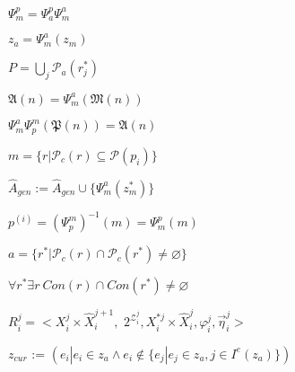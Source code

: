 \documentclass[preview,convert={density=800,outext=.png},border=5pt]{standalone}
\begin{document}
%	
%	

	$\Psi_m^p=\Psi_a^p\Psi_m^a$
	
	$z_a = \Psi_m^a(z_m)$
	
	$P=\bigcup_j\mathcal{P}_a(r_j^*)$
		
	$\mathfrak A(n)=\Psi_m^a(\mathfrak M(n))$
	
	$\Psi_m^a\Psi_p^m(\mathfrak P(n))=\mathfrak A(n)$
	
	$m=\{r|\mathcal{P}_c(r)\subseteq\mathcal{P}(p_i)\}$
	
	$\hat A_{gen} := \hat A_{gen}\cup\{\Psi_m^a(z_m^*)\}$
	
	$p^{(i)}={(\Psi_p^m)}^{-1}(m)=\Psi_m^p(m)$
	
	$a=\{r^*|\mathcal{P}_c(r)\cap\mathcal{P}_c(r^*)\not = \varnothing\}$
	
	$\forall r^*\exists r\ Con(r)\cap Con(r^*)\not = \varnothing$

	$R_i^j=<X_i^j\times \hat{X}_i^{j+1},$ $2^{\mathcal Z_i^j}, X_i^{*j}\times\hat{X}_i^j,\varphi_i^j,\overrightarrow\eta_i^j>$

	$z_{cur}$ := $(e_i|e_i\in z_a\land e_i\not\in\{e_j|e_j\in z_a, j\in I^e(z_a)\})$
	
%		
%		
%		
%		
%		
\end{document}
